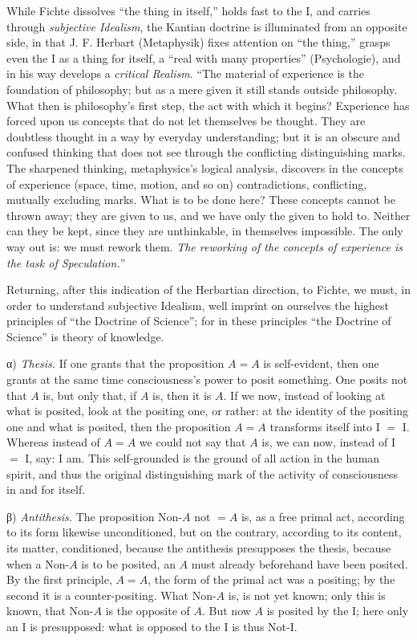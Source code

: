 \documentclass[12pt]{book}
\begin{document}
While Fichte dissolves ``the thing in itself,'' holds fast to the I, and carries
through \emph{subjective Idealism}, the Kantian doctrine is illuminated from an
opposite side, in that J. F. Herbart (Metaphysik) fixes attention on ``the
thing,'' grasps even the I as a thing for itself, a ``real with many properties''
(Psychologie), and in his way develops a \emph{critical Realism}. ``The material
of experience is the foundation of philosophy; but as a mere given it still stands
outside philosophy. What then is philosophy's first step, the act with which it
begins? Experience has forced upon us concepts that do not let themselves be
thought. They are doubtless thought in a way by everyday understanding; but it is
an obscure and confused thinking that does not see through the conflicting
distinguishing marks. The sharpened thinking, metaphysics's logical analysis,
discovers in the concepts of experience (space, time, motion, and so on)
contradictions, conflicting, mutually excluding marks. What is to be done here?
These concepts cannot be thrown away; they are given to us, and we have only the
given to hold to. Neither can they be kept, since they are unthinkable, in
themselves impossible. The only way out is: we must rework them. \emph{The
reworking of the concepts of experience is the task of Speculation.}''

Returning, after this indication of the Herbartian direction, to Fichte, we must,
in order to understand subjective Idealism, well imprint on ourselves the highest
principles of ``the Doctrine of Science''; for in these principles ``the Doctrine
of Science'' is theory of knowledge.

α) \emph{Thesis.} If one grants that the proposition $A = A$ is self-evident, then
one grants at the same time consciousness's power to posit something. One posits
not that $A$ is, but only that, if $A$ is, then it is $A$.
If we now, instead of looking at what is posited, look at the positing one, or
rather: at the identity of the positing one and what is posited, then the
proposition $A = A$ transforms itself into I $=$ I. Whereas instead of $A = A$ we
could not say that $A$ is, we can now, instead of I $=$ I, say: I am. This
self-grounded is the ground of all action in the human spirit, and thus the
original distinguishing mark of the activity of consciousness in and for itself.

β) \emph{Antithesis.} The proposition Non-$A$ not $=A$ is, as a free primal act,
according to its form likewise unconditioned, but on the contrary, according to
its content, its matter, conditioned, because the antithesis presupposes the
thesis, because when a Non-$A$ is to be posited, an $A$ must already beforehand
have been posited. By the first principle, $A = A$, the form of the primal act was
a positing; by the second it is a counter-positing. What Non-$A$ is, is not yet
known; only this is known, that Non-$A$ is the opposite of $A$. But now $A$ is
posited by the I; here only an I is presupposed: what is opposed to the I is thus
Not-I.
\end{document}
